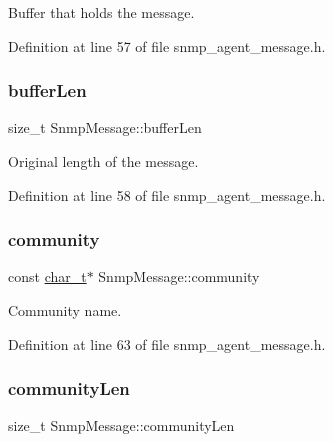 Buffer that holds the message. 



Definition at line 57 of file snmp\+\_\+agent\+\_\+message.\+h.

\mbox{\label{structSnmpMessage_a02cd31ab221cd718f39cf8621f98c0b6}} 
\subsubsection{\texorpdfstring{buffer\+Len}{bufferLen}}
{\footnotesize\ttfamily size\+\_\+t Snmp\+Message\+::buffer\+Len}



Original length of the message. 



Definition at line 58 of file snmp\+\_\+agent\+\_\+message.\+h.

\mbox{\label{structSnmpMessage_ac9976028507798166e3f542d5806c811}} 
\subsubsection{\texorpdfstring{community}{community}}
{\footnotesize\ttfamily const \hyperlink{compiler__port_8h_a40bb5262bf908c328fbcfbe5d29d0201}{char\+\_\+t}$\ast$ Snmp\+Message\+::community}



Community name. 



Definition at line 63 of file snmp\+\_\+agent\+\_\+message.\+h.

\mbox{\label{structSnmpMessage_a828b7eec855d512efcb5262ed979f8fa}} 
\subsubsection{\texorpdfstring{community\+Len}{communityLen}}
{\footnotesize\ttfamily size\+\_\+t Snmp\+Message\+::community\+Len}



